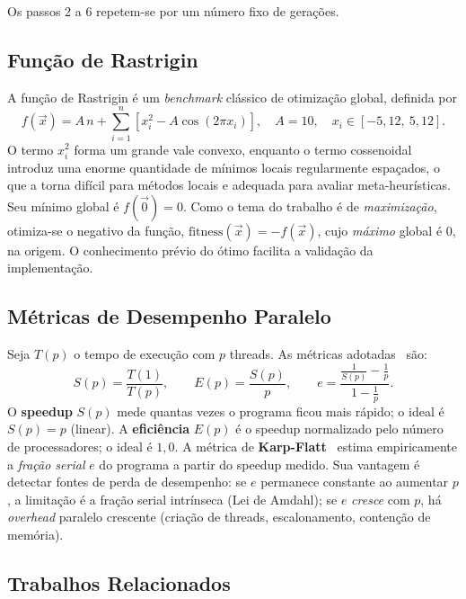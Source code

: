 \documentclass[12pt]{article}
\begin{document}
Os passos 2 a 6 repetem-se por um número fixo de gerações.

\subsection{Função de Rastrigin}

A função de Rastrigin é um \emph{benchmark} clássico de otimização global,
definida por
\begin{equation}
  f(\vec{x}) = A\,n + \sum_{i=1}^{n}\left[ x_i^2 - A\cos(2\pi x_i)\right],
  \quad A = 10, \quad x_i \in [-5{,}12,\ 5{,}12].
\end{equation}
O termo $x_i^2$ forma um grande vale convexo, enquanto o termo cossenoidal
introduz uma enorme quantidade de mínimos locais regularmente espaçados, o que
a torna difícil para métodos locais e adequada para avaliar meta-heurísticas.
Seu mínimo global é $f(\vec{0}) = 0$. Como o tema do trabalho é de
\emph{maximização}, otimiza-se o negativo da função,
$\text{fitness}(\vec{x}) = -f(\vec{x})$, cujo \emph{máximo} global é $0$, na
origem. O conhecimento prévio do ótimo facilita a validação da
implementação.

\subsection{Métricas de Desempenho Paralelo}

Seja $T(p)$ o tempo de execução com $p$ threads. As métricas
adotadas~\cite{grama:03} são:
\begin{equation}
  S(p) = \frac{T(1)}{T(p)}, \qquad
  E(p) = \frac{S(p)}{p}, \qquad
  e = \frac{\frac{1}{S(p)} - \frac{1}{p}}{1 - \frac{1}{p}}.
\end{equation}
O \textbf{speedup} $S(p)$ mede quantas vezes o programa ficou mais rápido; o
ideal é $S(p) = p$ (linear). A \textbf{eficiência} $E(p)$ é o speedup
normalizado pelo número de processadores; o ideal é $1{,}0$. A métrica de
\textbf{Karp-Flatt}~\cite{karp:90} estima empiricamente a \emph{fração serial}
$e$ do programa a partir do speedup medido. Sua vantagem é detectar fontes de
perda de desempenho: se $e$ permanece constante ao aumentar $p$, a limitação é
a fração serial intrínseca (Lei de Amdahl); se $e$ \emph{cresce} com $p$, há
\emph{overhead} paralelo crescente (criação de threads, escalonamento,
contenção de memória).

\subsection{Trabalhos Relacionados}
\end{document}
